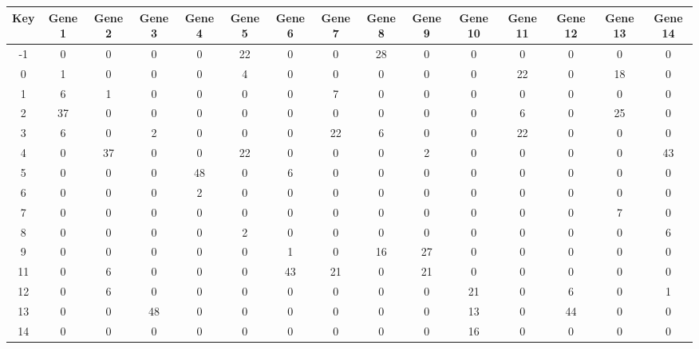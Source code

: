 \begin{tabular}{|c|c|c|c|c|c|c|c|c|c|c|c|c|c|c|}
\hline
Key & Gene 1 & Gene 2 & Gene 3 & Gene 4 & Gene 5 & Gene 6 & Gene 7 & Gene 8 & Gene 9 & Gene 10 & Gene 11 & Gene 12 & Gene 13 & Gene 14 \\
\hline
-1 & 0 & 0 & 0 & 0 & 22 & 0 & 0 & 28 & 0 & 0 & 0 & 0 & 0 & 0 \\
0 & 1 & 0 & 0 & 0 & 4 & 0 & 0 & 0 & 0 & 0 & 22 & 0 & 18 & 0 \\
1 & 6 & 1 & 0 & 0 & 0 & 0 & 7 & 0 & 0 & 0 & 0 & 0 & 0 & 0 \\
2 & 37 & 0 & 0 & 0 & 0 & 0 & 0 & 0 & 0 & 0 & 6 & 0 & 25 & 0 \\
3 & 6 & 0 & 2 & 0 & 0 & 0 & 22 & 6 & 0 & 0 & 22 & 0 & 0 & 0 \\
4 & 0 & 37 & 0 & 0 & 22 & 0 & 0 & 0 & 2 & 0 & 0 & 0 & 0 & 43 \\
5 & 0 & 0 & 0 & 48 & 0 & 6 & 0 & 0 & 0 & 0 & 0 & 0 & 0 & 0 \\
6 & 0 & 0 & 0 & 2 & 0 & 0 & 0 & 0 & 0 & 0 & 0 & 0 & 0 & 0 \\
7 & 0 & 0 & 0 & 0 & 0 & 0 & 0 & 0 & 0 & 0 & 0 & 0 & 7 & 0 \\
8 & 0 & 0 & 0 & 0 & 2 & 0 & 0 & 0 & 0 & 0 & 0 & 0 & 0 & 6 \\
9 & 0 & 0 & 0 & 0 & 0 & 1 & 0 & 16 & 27 & 0 & 0 & 0 & 0 & 0 \\
11 & 0 & 6 & 0 & 0 & 0 & 43 & 21 & 0 & 21 & 0 & 0 & 0 & 0 & 0 \\
12 & 0 & 6 & 0 & 0 & 0 & 0 & 0 & 0 & 0 & 21 & 0 & 6 & 0 & 1 \\
13 & 0 & 0 & 48 & 0 & 0 & 0 & 0 & 0 & 0 & 13 & 0 & 44 & 0 & 0 \\
14 & 0 & 0 & 0 & 0 & 0 & 0 & 0 & 0 & 0 & 16 & 0 & 0 & 0 & 0 \\
\hline
\end{tabular}
